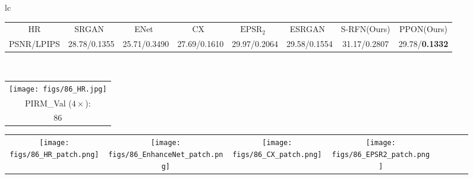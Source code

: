 \documentclass[preprint]{elsarticle}
\begin{document}
\begin{figure*}[htpb]
{\begin{tabular}{lc}
\begin{adjustbox}{valign=t}
\begin{tabular}{cccccccc}
					HR & \hspace{-3mm} SRGAN~\cite{SRGAN} & \hspace{-3mm} ENet~\cite{EnhanceNet} & \hspace{-3mm} CX~\cite{CX} & \hspace{-3mm} $\text{EPSR}_2$~\cite{EPSR} & \hspace{-3mm} ESRGAN~\cite{ESRGAN} & \hspace{-3mm} S-RFN(Ours) & \hspace{-3mm} PPON(Ours)\\
					
					PSNR/LPIPS & \hspace{-3mm} 28.78/0.1355 & \hspace{-3mm} 25.71/0.3490 & \hspace{-3mm} 27.69/0.1610 & \hspace{-3mm} 29.97/0.2064 & \hspace{-3mm} 29.58/0.1554 & \hspace{-3mm} 31.17/0.2807 & \hspace{-3mm} 29.78/\textbf{0.1332} \\
				\end{tabular}
			\end{adjustbox}
			\\
			
\begin{adjustbox}{valign=t}
				\scriptsize
				\begin{tabular}{c}
					\texttt{[image: figs/86\_HR.jpg]} \\
					PIRM\_Val ($4 \times$): \\
					86 \\
				\end{tabular}
			\end{adjustbox}
			\hspace{-3mm}
			\begin{adjustbox}{valign=t}
				\scriptsize
				\begin{tabular}{cccccccc}
					\texttt{[image: figs/86\_HR\_patch.png]} &
					\hspace{-3mm}
					\texttt{[image: figs/86\_EnhanceNet\_patch.png]} &
					\hspace{-3mm}
					\texttt{[image: figs/86\_CX\_patch.png]} &
					\hspace{-3mm}
					\texttt{[image: figs/86\_EPSR2\_patch.png]} &
					\hspace{-3mm}
					

\end{tabular}
\end{adjustbox}
\end{tabular}}
\end{figure*}
\end{document}
